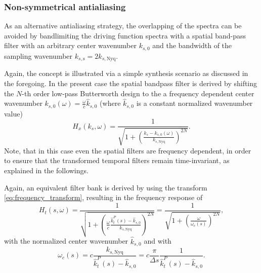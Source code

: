\documentclass[conference]{IEEEtran}
\begin{document}
\subsubsection{Non-symmetrical antialiasing}
As an alternative antialiasing strategy, the overlapping of the spectra can be avoided by bandlimiting the driving function spectra with a spatial band-pass filter with an arbitrary center wavenumber $k_{s,0}$ and the bandwidth of the sampling wavenumber $k_{s,\mathrm{s}} = 2 k_{s,\mathrm{Nyq}}$.

Again, the concept is illustrated via a simple synthesis scenario as discussed in the foregoing.
In the present case the spatial bandpass filter is derived by shifting the $N$-th order low-pass Butterworth design to the a frequency dependent center wavenumber $k_{s,0}(\omega) = \frac{\omega}{c} \hat{k}_{s,0}$ (where $\hat{k}_{s,0}$ is a constant normalized wavenumber value)
\begin{equation}
    H_x(k_s, \omega) = \frac{ 1 }{ \sqrt{ 1 + \left( \frac{k_s-k_{s,0}(\omega)}{k_{s,\mathrm{Nyq}} }\right)^{2N} } }.
\end{equation}
Note, that in this case even the spatial filters are frequency dependent, in order to ensure that the transformed temporal filters remain time-invariant, as explained in the followings.

Again, an equivalent filter bank is derived by using the transform \eqref{eq:frequency_transform}, resulting in the frequency response of
\begin{equation}
    H_t(s,\omega) = \frac{ 1 }{ \sqrt{ 1 + \left( \frac{\omega}{c}\frac{\hat{k}_t^P(s) - \hat{k}_{s,0}}{k_{s,\mathrm{Nyq}}}  \right)^{2N} } } =  \frac{ 1 }{ \sqrt{ 1 + \left( \frac{\omega}{\omega_c(s)}  \right)^{2N} } }
    ,
\end{equation}
with the normalized center wavenumber $\hat{k}_{s,0}$ and with
\begin{equation}
    \omega_c(s) = c \frac{k_{s,\mathrm{Nyq}}}{\hat{k}_t^P(s) - \hat{k}_{s,0}} = c\frac{ \pi}{\Delta s} \frac{1}{\hat{k}_t^P(s) - \hat{k}_{s,0}}.
    \label{eq:cutoff_asymm}
\end{equation}
\end{document}
